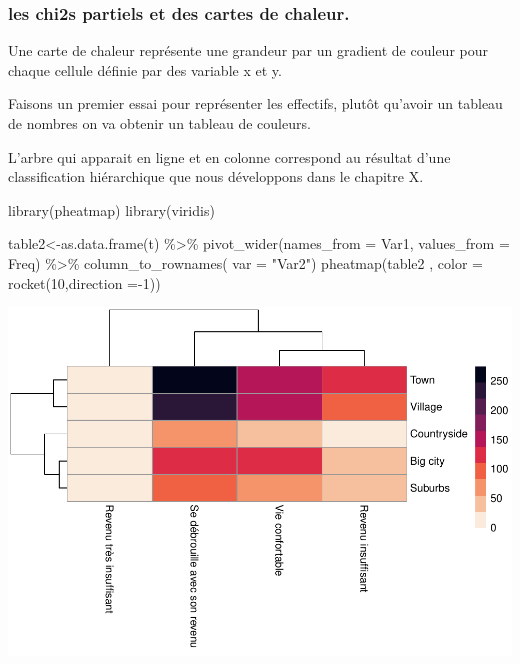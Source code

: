 \documentclass[
]{book}
\newenvironment{Shaded}{\begin{snugshade}}{\end{snugshade}}
\newcommand{\AttributeTok}[1]{\textcolor[rgb]{0.77,0.63,0.00}{#1}}
\newcommand{\DecValTok}[1]{\textcolor[rgb]{0.00,0.00,0.81}{#1}}
\newcommand{\FunctionTok}[1]{\textcolor[rgb]{0.00,0.00,0.00}{#1}}
\newcommand{\NormalTok}[1]{#1}
\newcommand{\OtherTok}[1]{\textcolor[rgb]{0.56,0.35,0.01}{#1}}
\newcommand{\SpecialCharTok}[1]{\textcolor[rgb]{0.00,0.00,0.00}{#1}}
\newcommand{\StringTok}[1]{\textcolor[rgb]{0.31,0.60,0.02}{#1}}
\begin{document}
\hypertarget{les-chi2s-partiels-et-des-cartes-de-chaleur.}{%
\subsubsection{les chi2s partiels et des cartes de chaleur.}\label{les-chi2s-partiels-et-des-cartes-de-chaleur.}}

Une carte de chaleur représente une grandeur par un gradient de couleur pour chaque cellule définie par des variable x et y.

Faisons un premier essai pour représenter les effectifs, plutôt qu'avoir un tableau de nombres on va obtenir un tableau de couleurs.

L'arbre qui apparait en ligne et en colonne correspond au résultat d'une classification hiérarchique que nous développons dans le chapitre X.

\begin{Shaded}
\begin{Highlighting}[]
\FunctionTok{library}\NormalTok{(pheatmap)}
\FunctionTok{library}\NormalTok{(viridis)}

\NormalTok{table2}\OtherTok{\textless{}{-}}\FunctionTok{as.data.frame}\NormalTok{(t) }\SpecialCharTok{\%\textgreater{}\%}
  \FunctionTok{pivot\_wider}\NormalTok{(}\AttributeTok{names\_from =}\NormalTok{ Var1, }\AttributeTok{values\_from =}\NormalTok{ Freq) }\SpecialCharTok{\%\textgreater{}\%}
  \FunctionTok{column\_to\_rownames}\NormalTok{( }\AttributeTok{var =} \StringTok{"Var2"}\NormalTok{)}
\FunctionTok{pheatmap}\NormalTok{(table2 , }\AttributeTok{color =} \FunctionTok{rocket}\NormalTok{(}\DecValTok{10}\NormalTok{,}\AttributeTok{direction =}\SpecialCharTok{{-}}\DecValTok{1}\NormalTok{))}
\end{Highlighting}
\end{Shaded}

\includegraphics{bookdown-demo_files/figure-latex/0429-1.pdf}
\end{document}
